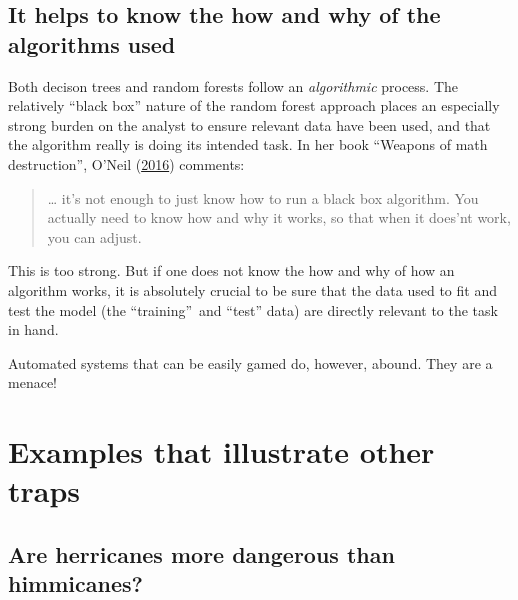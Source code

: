 \documentclass[
  10pt,
  b5paper]{book}
\begin{document}
\hypertarget{it-helps-to-know-the-how-and-why-of-the-algorithms-used}{%
\subsection*{It helps to know the how and why of the algorithms used}\label{it-helps-to-know-the-how-and-why-of-the-algorithms-used}}

Both decison trees and random forests follow an \emph{algorithmic}
process. The relatively ``black box'' nature of the random
forest approach places an especially strong burden on the
analyst to ensure relevant data have been used, and that the
algorithm really is doing its intended task.
In her book ``Weapons of math destruction'', O'Neil (\protect\hyperlink{ref-oneil_2016}{2016})
comments:

\begin{quote}
\ldots{} it's not enough to just know how to run a black box
algorithm. You actually need to know how and why it works,
so that when it does'nt work, you can adjust.
\end{quote}

This is too strong. But if one does not know the how and
why of how an algorithm works, it is absolutely crucial to
be sure that the data used to fit and test the model
(the ``training''~and ``test'' data) are directly relevant to
the task in hand.

Automated systems that can be easily gamed do, however,
abound. They are a menace!

\hypertarget{examples-that-illustrate-other-traps}{%
\section{Examples that illustrate other traps}\label{examples-that-illustrate-other-traps}}

\hypertarget{are-herricanes-more-dangerous-than-himmicanes}{%
\subsection*{Are herricanes more dangerous than himmicanes?}\label{are-herricanes-more-dangerous-than-himmicanes}}
\end{document}
